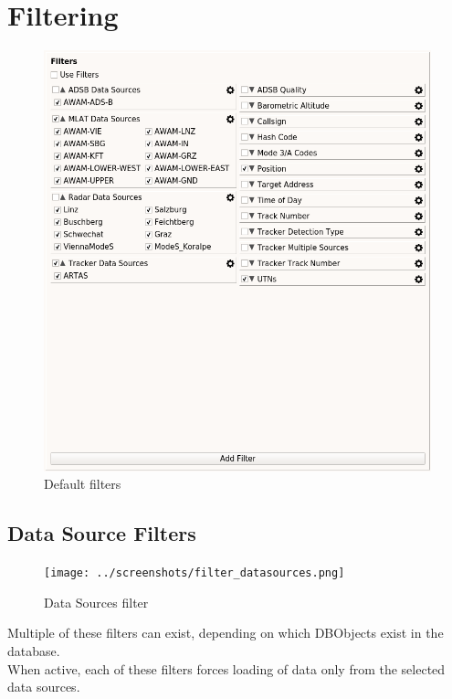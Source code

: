 \section{Filtering}
\label{sec:filtering}

\begin{figure}[H]
  \center
    \includegraphics[width=14cm,frame]{../screenshots/load_filters.png}
  \caption{Default filters}
\end{figure}

\subsection{Data Source Filters}

\begin{figure}[H]
  \center
    \texttt{[image: ../screenshots/filter\_datasources.png]}
  \caption{Data Sources filter}
\end{figure}

Multiple of these filters can exist, depending on which DBObjects exist in the database. \\

When active, each of these filters forces loading of data only from the selected data sources. \\

